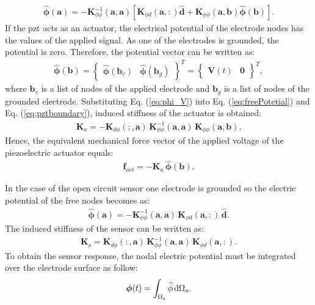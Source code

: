 \begin{eqnarray}
	\widehat{\boldsymbol{\phi}}(\textbf{a}) = -\textbf{K}_{\phi\phi}^{-1}(\textbf{a},\textbf{a})\left[\textbf{K}_{\phi d}(\textbf{a},:) \widehat{\textbf{d}} + \textbf{K}_{\phi\phi}(\textbf{a},\textbf{b})\widehat{\boldsymbol{\phi}}(\textbf{b}) \right].
	\label{eq:freePotetial}
\end{eqnarray}
If the \ac{pzt} acts as an actuator, the electrical potential of the electrode nodes has the values of the applied signal.
As one of the electrodes is grounded, the potential is zero.
Therefore, the potential vector can be written as:
\begin{eqnarray}
	\widehat{\boldsymbol{\phi}}(\textbf{b}) = \left \{\begin{array}{cc}
		\widehat{\boldsymbol{\phi}}(\textbf{b}_v) &
		\widehat{\boldsymbol{\phi}}(\textbf{b}_g)
	\end{array}\right \}^T=\left \{\begin{array}{cc}
	\textbf{V}(t) & \textbf{0}
	\end{array}\right \}^T,
	\label{eq:phi_V}
\end{eqnarray}
where \(\textbf{b}_v\) is a list of nodes of the applied electrode and \(\textbf{b}_g\) is a list of nodes of the grounded electrode.
Substituting Eq. (\ref{eq:phi_V}) into Eq. (\ref{eq:freePotetial}) and Eq. (\ref{eq:pztboundary}), induced stiffness of the actuator is obtained:
\begin{eqnarray}
	\textbf{K}_{a}=-\textbf{K}_{d\phi}(:,\textbf{a})\,\textbf{K}_{\phi \phi}^{-1}(\textbf{a},\textbf{a})\,\textbf{K}_{\phi \phi} (\textbf{a},\textbf{b}).
\end{eqnarray}
Hence, the equivalent mechanical force vector of the applied voltage of the piezoelectric actuator equals:
\begin{eqnarray}
	\widehat{\textbf{f}}_{act}=-\textbf{K}_{a}\,\widehat{\boldsymbol{\phi}}(\textbf{b}).
	\label{eq:f_act}
\end{eqnarray}

In the case of the open circuit sensor one electrode is grounded so the electric potential of the free nodes becomes as:
\begin{eqnarray}
	\widehat{\boldsymbol{\phi}}(\textbf{a}) = -\textbf{K}_{\phi\phi}^{-1}(\textbf{a},\textbf{a})\,\textbf{K}_{\phi d}(\textbf{a},:)\,\widehat{\textbf{d}}.
	\label{eq:sensorPotetial}
\end{eqnarray}
The induced stiffness of the sensor can be written as:
\begin{eqnarray} \textbf{K}_s=\textbf{K}_{d \phi}(:,\textbf{a})\,\textbf{K}_{\phi \phi}^{-1} (\textbf{a},\textbf{a})\,\textbf{K}_{\phi d}(\textbf{a},:).
\end{eqnarray}
To obtain the sensor response, the nodal electric potential must be integrated over the electrode surface as follow:
\begin{eqnarray}
	\boldsymbol{\phi}(t) = \int_{\Omega_s}\widehat{\phi} \mathop{}\!\mathrm{d}\Omega_s.
	\label{eq:sensorResponse}
\end{eqnarray}